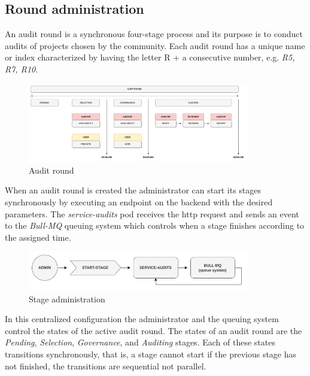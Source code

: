 \documentclass[9pt]{article}
\begin{document}
\subsection { Round administration }

An audit round is a synchronous four-stage process and its purpose is to conduct audits of projects chosen by the community. Each audit round has a unique name or index characterized by having the letter R + a consecutive number, e.g. \emph{R5, R7, R10}. 

\begin{figure}[ht]
  \centering
  \includegraphics[width=0.86\textwidth]{round.png}
  \caption{Audit round}
  \label{fig:mi_imagen}
\end{figure}

When an audit round is created the administrator can start its stages synchronously by executing an endpoint on the backend with the desired parameters. The \emph{service-audits} pod receives the http request and sends an event to the \emph{Bull-MQ} queuing system which controls when a stage finishes according to the assigned time.

\begin{figure}[ht]
  \centering
  \includegraphics[width=0.86\textwidth]{admin.png}
  \caption{Stage administration}
  \label{fig:mi_imagen}
\end{figure}

In this centralized configuration the administrator and the queuing system control the states of the active audit round. The states of an audit round are the \emph{Pending}, \emph{Selection}, \emph{Governance}, and \emph{Auditing} stages. Each of these states transitions synchronously, that is, a stage cannot start if the previous stage has not finished, the transitions are sequential not parallel.
\end{document}
